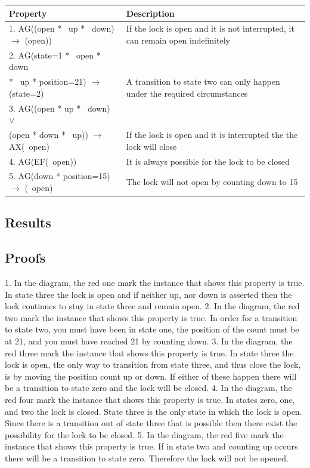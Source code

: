 \documentclass[11pt]{article}
\begin{document}
\begin{tabularx}{\textwidth}{l|X}
  \textbf{Property} & \textbf{Description} \\
\hline
	1. AG((open * ~up * ~down) $\to$ (open)) 	&	If the lock is open and it is not interrupted, it can remain open indefinitely \\
	2. AG(state=1 * ~open * down \\ * ~up * position=21) $\to$ (state=2) & A transition to state two can only happen under the required circumstances \\

	3. 	AG((open * up * ~down) $\vee$ \\ (open * down * ~up)) $\to$ AX(~open) & If the lock is open and it is interrupted the the lock will close \\

	4. AG(EF(~open)) & It is always possible for the lock to be closed\\
		

	5. AG(down * position=15) $\to$ (~open) & The lock will not open by counting down to 15\\
		
\end{tabularx}	
	

	
	\subsection{Results}
	\subsection{Proofs}
1. In the diagram, the red one mark the instance that shows this property is true. In state three the lock is open and if neither up, nor down is asserted then the lock continues to stay in state three and remain open.
2. In the diagram, the red two mark the instance that shows this property is true. In order for a transition to state two, you must have been in state one, the position of the count must be at 21, and you must have reached 21 by counting down.
3. In the diagram, the red three mark the instance that shows this property is true. In state three the lock is open, the only way to transition from state three, and thus close the lock, is by moving the position count up or down. If either of these happen there will be a transition to state zero and the lock will be closed.
4. In the diagram, the red four mark the instance that shows this property is true. In states zero, one, and two the lock is closed. State three is the only state in which the lock is open. Since there is a transition out of state three that is possible then there exist the possibility for the lock to be closed.
5. In the diagram, the red five mark the instance that shows this property is true. If in state two and counting up occurs there will be a transition to state zero. Therefore the lock will not be opened. 
	
\end{document}
